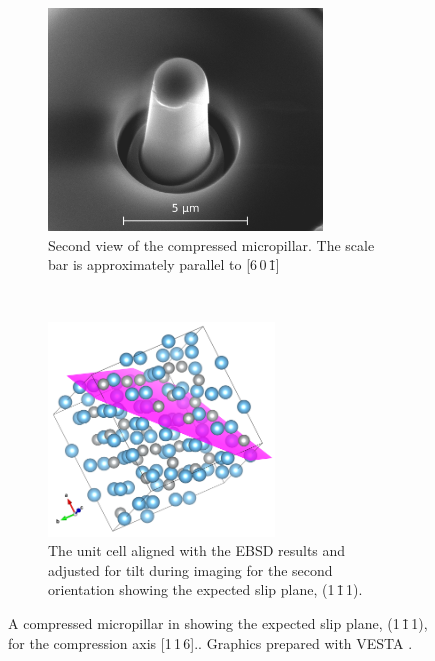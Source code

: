 \begin{figure}
\begin{subfigure}{0.45\textwidth}
\includegraphics[width=0.8\textwidth]{pillar_3_v2}
\caption{Second view of the compressed  micropillar. The scale bar is approximately parallel to [6\,0\,\={1}]}
\end{subfigure}
~
\begin{subfigure}{0.45\textwidth}
\centering
\includegraphics[width=0.66\textwidth]{Pillar_3_unit_cell_v2}
\caption{The unit cell aligned with the EBSD results and adjusted for tilt during imaging for the second orientation showing the expected slip plane, (1\,\={1}\,1).}
\end{subfigure}
\caption[A compressed micropillar of  showing the slip plane.]{A compressed micropillar in  showing the expected slip plane, (1\,\={1}\,1), for the compression axis [1\,1\,6].\label{fig:micropillar}. Graphics prepared with VESTA \cite{Momma2011}.}
\end{figure}


